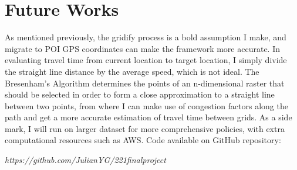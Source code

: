 \documentclass[letterpaper, 10 pt, conference]{ieeeconf}
\begin{document}
\section{Future Works}
As mentioned previously, the gridify process is a bold assumption I make, and migrate to POI GPS coordinates can make the framework more accurate. In evaluating travel time from current location to target location, I simply divide the straight line distance by the average speed, which is not ideal. The Bresenham's Algorithm determines the points of an n-dimensional raster that should be selected in order to form a close approximation to a straight line between two points\cite{bresenham}, from where I can make use of congestion factors along the path and get a more accurate estimation of travel time between grids. As a side mark, I will run on larger dataset for more comprehensive policies, with extra computational resources such as AWS. Code available on GitHub repository:
\begin{center}
\textit{https://github.com/JulianYG/221finalproject}
\end{center}


\end{document}
